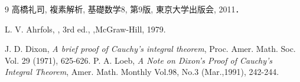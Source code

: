 \documentclass[leqno, 12pt, a4paper]{jsarticle}
\begin{document}
\begin{thebibliography}{9}
高橋礼司, 
複素解析,
基礎数学8,
第9版,
東京大学出版会,
2011．

L.  V.  Ahrfols, 
,
3rd ed., ,McGraw-Hill, 
1979. 

J.  D. Dixon,
\textit{
A brief proof of Cauchy's integral theorem},
Proc. Amer. Math.  Soc. Vol. 29 (1971), 625-626. 
P.  A. 
Loeb, 
\textit{A Note on Dixon's Proof of Cauchy's Integral Theorem}, Amer.  Math. 
Monthly Vol.98, No.3 (Mar.,1991), 242-244. 
\end{thebibliography}




			
\end{document}
